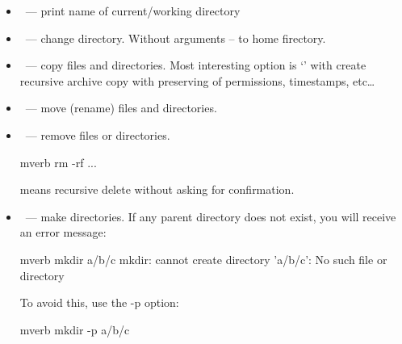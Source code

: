 \begin{itemize}
Also we can see directory listing recursively:
\begin{code}{mverb}
ls -R
\end{code}
Another very important option is the ``long list'':
\begin{code}{mverb}
ls -l
\end{code}
We see a table with information about the file/directory in the corresponding
lines.
\begin{itemize}
\item The first column is the file attribute. The first letter is the file
      type: ``dash'' is a regular file, ``d'' is a directory, and so on.
      Then we can see read, write, and execute permissions for three user
      groups: owner, owner group, and everyone else. Once again, we see
      the difference between UNIX and Microsoft. In the first case it is
      an attribute, in the second case executability is just a naming
      convention: '.com', '.exe', '.bat'.
\item Some mystery column that we will discuss later.
\item Then we can see owner and owner group, size of file, time of
      modification and the name of file. 
\end{itemize}
\item {}~--- print name of current/working directory
\item {}~--- change directory. Without arguments -- to home firectory.
\item {}~--- copy files and directories. Most interesting option
                   is `' with create recursive
                   archive copy with preserving of permissions, timestamps, etc\ldots
\item {}~--- move (rename) files and directories.
\item {}~--- remove files or directories.
\begin{code}{mverb}
rm -rf ...
\end{code}
means recursive delete without asking for confirmation.
\item {}~--- make directories. If any parent directory does not exist,
      you will receive an error message:
\begin{code}{mverb}
mkdir a/b/c
mkdir: cannot create directory 'a/b/c': No such file or directory
\end{code}
To avoid this, use the -p option:
\begin{code}{mverb}
mkdir -p a/b/c
\end{code}

\end{itemize}
